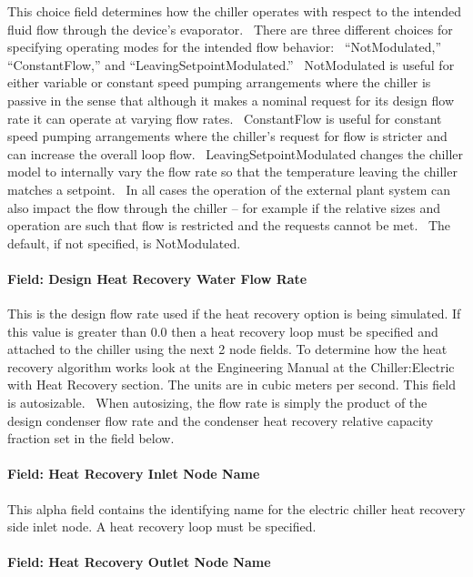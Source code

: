 This choice field determines how the chiller operates with respect to the intended fluid flow through the device's evaporator.~ There are three different choices for specifying operating modes for the intended flow behavior:~ ``NotModulated,'' ``ConstantFlow,'' and ``LeavingSetpointModulated.''~ NotModulated is useful for either variable or constant speed pumping arrangements where the chiller is passive in the sense that although it makes a nominal request for its design flow rate it can operate at varying flow rates.~ ConstantFlow is useful for constant speed pumping arrangements where the chiller's request for flow is stricter and can increase the overall loop flow.~ LeavingSetpointModulated changes the chiller model to internally vary the flow rate so that the temperature leaving the chiller matches a setpoint.~ In all cases the operation of the external plant system can also impact the flow through the chiller -- for example if the relative sizes and operation are such that flow is restricted and the requests cannot be met.~ The default, if not specified, is NotModulated.

\paragraph{Field: Design Heat Recovery Water Flow Rate}\label{field-design-heat-recovery-water-flow-rate-000}

This is the design flow rate used if the heat recovery option is being simulated. If this value is greater than 0.0 then a heat recovery loop must be specified and attached to the chiller using the next 2 node fields. To determine how the heat recovery algorithm works look at the Engineering Manual at the Chiller:Electric with Heat Recovery section. The units are in cubic meters per second. This field is autosizable.~ When autosizing, the flow rate is simply the product of the design condenser flow rate and the condenser heat recovery relative capacity fraction set in the field below.

\paragraph{Field: Heat Recovery Inlet Node Name}\label{field-heat-recovery-inlet-node-name-000}

This alpha field contains the identifying name for the electric chiller heat recovery side inlet node. A heat recovery loop must be specified.

\paragraph{Field: Heat Recovery Outlet Node Name}\label{field-heat-recovery-outlet-node-name-000}

